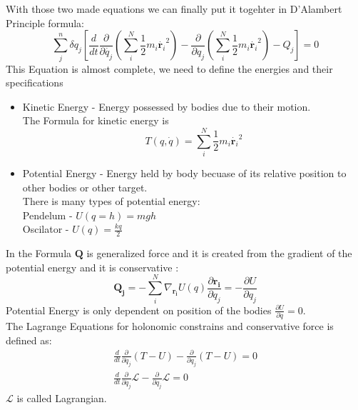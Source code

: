 With those two made equations we can finally put it togehter in D'Alambert Principle formula:
\begin{equation}
	\sum_j^n{\delta q_j\left[\frac{d}{dt}\frac{\partial}{\partial \dot{q_j}}\left(\sum_i^N\frac{1}{2}m_i\dot{\mathbf{r}_i}^2\right)-\frac{\partial}{\partial q_j}\left(\sum_i^N\frac{1}{2}m_i\dot{\mathbf{r}_i}^2\right)- Q_j\right]} =0 
\end{equation}
This Equation is almost complete, we need to define the energies and their specifications

\begin{itemize}
	\item Kinetic Energy - Energy possessed by bodies due to their motion.\\
	The Formula for kinetic energy is
	\begin{equation}
		T(q,\dot{q}) = \sum_i^N\frac{1}{2}m_i\dot{\mathbf{r}_i}^2
	\end{equation}
	\item Potential Energy - Energy held by body becuase of its relative position to other bodies or other target.\\
	There is many types of potential energy:\\
	Pendelum - $U(q=h)=mgh$\\
	Oscilator - $U(q)=\frac{kq}{2}$ 
\end{itemize}
In the Formula $\mathbf{Q}$ is generalized force and it is created from the gradient of the potential energy and it is conservative :
\begin{equation}
	\mathbf{Q_j} =- \sum^N_i \nabla_{\mathbf{r_i}}U(q)\frac{\partial\mathbf{r_i}}{\partial q_j}= -\frac{\partial U}{\partial q_j}
\end{equation} 
Potential Energy is only dependent on position of the bodies $\frac{\partial U}{\partial \dot{q}} = 0$.\\
The Lagrange Equations for holonomic constrains and conservative force is defined as:
\begin{eqnarray}
\frac{d}{dt}\frac{\partial}{\partial \dot{q_j}}\left(T-U\right)-\frac{\partial}{\partial q_j}\left(T-U\right) =0\\
\frac{d}{dt}\frac{\partial}{\partial \dot{q_j}}\mathcal{L}-\frac{\partial}{\partial q_j}\mathcal{L} =0
\end{eqnarray}
$\mathcal{L}$ is called Lagrangian.
